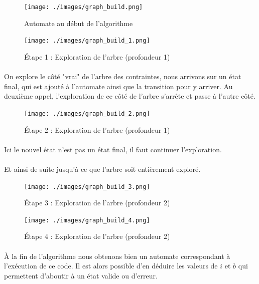 \begin{figure}[H]
 \centering
 \texttt{[image: ./images/graph\_build.png]}
 \caption{Automate au début de l'algorithme}
\end{figure}


 
 \begin{figure}[H]
  \centering
  \texttt{[image: ./images/graph\_build\_1.png]}
  \caption{Étape 1 : Exploration de l'arbre (profondeur 1)}
 \end{figure}

 \paragraph{} On explore le côté "vrai" de l'arbre des contraintes, nous 
arrivons sur un état final, qui est 
ajouté à l'automate ainsi que la transition pour y arriver. Au deuxième appel, 
l'exploration de ce côté de l'arbre s'arrête et passe à l'autre côté.


 \begin{figure}[H]
  \centering
  \texttt{[image: ./images/graph\_build\_2.png]}
  \caption{Étape 2 : Exploration de l'arbre (profondeur 1)}
 \end{figure}
 \paragraph{} Ici le nouvel état n'est pas un état final, il faut continuer 
l'exploration.
 \paragraph{} Et ainsi de suite jusqu'à ce que l'arbre soit 
entièrement exploré.


 \begin{figure}[H]
  \centering
  \texttt{[image: ./images/graph\_build\_3.png]}
  \caption{Étape 3 : Exploration de l'arbre (profondeur 2)}
 \end{figure}

\begin{figure}[H]
  \centering
  \texttt{[image: ./images/graph\_build\_4.png]}
  \caption{Étape 4 : Exploration de l'arbre (profondeur 2)}
  \label{fig:automate_construit}
 \end{figure}


\paragraph{}
À la fin de l'algorithme nous obtenons bien un automate correspondant à 
l'exécution de ce code. Il est alors possible d'en déduire les valeurs de $i$ 
et 
$b$ qui permettent d'aboutir à un état valide ou d'erreur.

